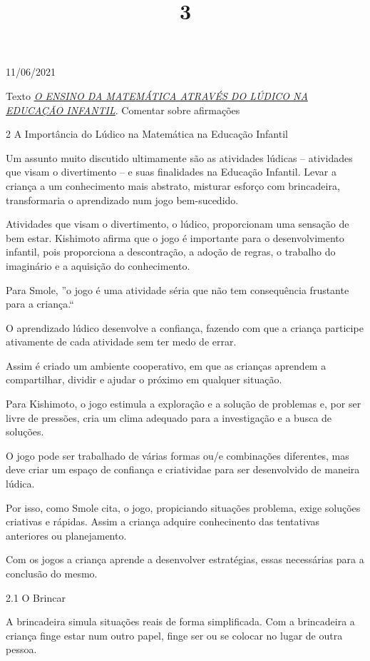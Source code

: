 \documentclass{SchoolBook}
\begin{document}
    \begin{day}{11/06/2021}
        \title{3}{Texto \emph{\href{https://drive.google.com/file/d/167RWN6Z-7H5BkAholpEdeZX116oSQB6u/view}{O ENSINO DA MATEMÁTICA ATRAVÉS DO LÚDICO NA EDUCAÇÃO INFANTIL}}. Comentar sobre afirmações}
        
        2 A Importância do Lúdico na Matemática na Educação Infantil
        
        Um assunto muito discutido ultimamente são as atividades lúdicas -- atividades que visam o divertimento -- e suas finalidades na Educação Infantil. Levar a criança a um conhecimento mais abstrato, misturar esforço com brincadeira, transformaria o aprendizado num jogo bem-sucedido.
        
        Atividades que visam o divertimento, o lúdico, proporcionam uma sensação de bem estar. Kishimoto afirma que o jogo é importante para o desenvolvimento infantil, pois proporciona a descontração, a adoção de regras, o trabalho do imaginário e a aquisição do conhecimento.
        
        Para Smole, ''o jogo é uma atividade séria que não tem consequência frustante para a criança.``
        
        O aprendizado lúdico desenvolve a confiança, fazendo com que a criança participe ativamente de cada atividade sem ter medo de errar.
        
        Assim é criado um ambiente cooperativo, em que as crianças aprendem a compartilhar, dividir e ajudar o próximo em qualquer situação.
        
        Para Kishimoto, o jogo estimula a exploração e a solução de problemas e, por ser livre de pressões, cria um clima adequado para a investigação e a busca de soluções.
        
        O jogo pode ser trabalhado de várias formas ou/e combinações diferentes, mas deve criar um espaço de confiança e criatividae para ser desenvolvido de maneira lúdica.
        
        Por isso, como Smole cita, o jogo, propiciando situações problema, exige soluções criativas e rápidas. Assim a criança adquire conhecinento das tentativas anteriores ou planejamento.
        
        Com os jogos a criança aprende a desenvolver estratégias, essas necessárias para a conclusão do mesmo.
        
        2.1 O Brincar
        
        A brincadeira simula situações reais de forma simplificada. Com a brincadeira a criança finge estar num outro papel, finge ser ou se colocar no lugar de outra pessoa.
        

\end{day}
\end{document}
